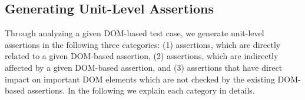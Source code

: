 \subsection{Generating Unit-Level Assertions} \label{Sec:unitLevelAssertion}
Through analyzing a given DOM-based test case, we generate unit-level assertions in the following three categories: (1) assertions, which are directly related to a given DOM-based assertion, (2) assertions, which are indirectly affected by a given DOM-based assertion, and (3) assertions that have direct impact on important DOM elements which are not checked by the existing DOM-based assertions. In the following we explain each category in details.



 